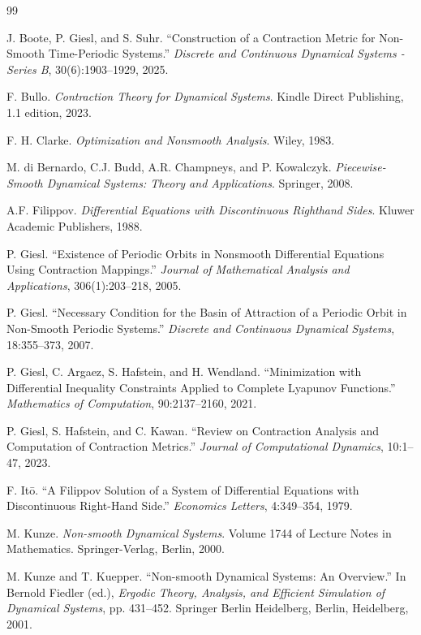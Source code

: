 \documentclass[11pt]{article}
\begin{document}
\begin{thebibliography}{99}
	
	J. Boote, P. Giesl, and S. Suhr. “Construction of a Contraction Metric for Non-Smooth Time-Periodic Systems.” \emph{Discrete and Continuous Dynamical Systems - Series B}, 30(6):1903–1929, 2025.
	
	F. Bullo. \emph{Contraction Theory for Dynamical Systems}. Kindle Direct Publishing, 1.1 edition, 2023.
	
	F. H. Clarke. \emph{Optimization and Nonsmooth Analysis}. Wiley, 1983.
	
	M. di Bernardo, C.J. Budd, A.R. Champneys, and P. Kowalczyk. \emph{Piecewise-Smooth Dynamical Systems: Theory and Applications}. Springer, 2008.
	
	A.F. Filippov. \emph{Differential Equations with Discontinuous Righthand Sides}. Kluwer Academic Publishers, 1988.
	
	P. Giesl. “Existence of Periodic Orbits in Nonsmooth Differential Equations Using Contraction Mappings.” \emph{Journal of Mathematical Analysis and Applications}, 306(1):203–218, 2005.
	
	P. Giesl. “Necessary Condition for the Basin of Attraction of a Periodic Orbit in Non-Smooth Periodic Systems.” \emph{Discrete and Continuous Dynamical Systems}, 18:355–373, 2007.
	
	P. Giesl, C. Argaez, S. Hafstein, and H. Wendland. “Minimization with Differential Inequality Constraints Applied to Complete Lyapunov Functions.” \emph{Mathematics of Computation}, 90:2137–2160, 2021.
	
	P. Giesl, S. Hafstein, and C. Kawan. “Review on Contraction Analysis and Computation of Contraction Metrics.” \emph{Journal of Computational Dynamics}, 10:1–47, 2023.
	
	F. Itō. “A Filippov Solution of a System of Differential Equations with Discontinuous Right-Hand Side.” \emph{Economics Letters}, 4:349–354, 1979.
	
	M. Kunze. \emph{Non-smooth Dynamical Systems}. Volume 1744 of Lecture Notes in Mathematics. Springer-Verlag, Berlin, 2000.
	
	M. Kunze and T. Kuepper. “Non-smooth Dynamical Systems: An Overview.” In Bernold Fiedler (ed.), \emph{Ergodic Theory, Analysis, and Efficient Simulation of Dynamical Systems}, pp. 431–452. Springer Berlin Heidelberg, Berlin, Heidelberg, 2001.
	

\end{thebibliography}
\end{document}
